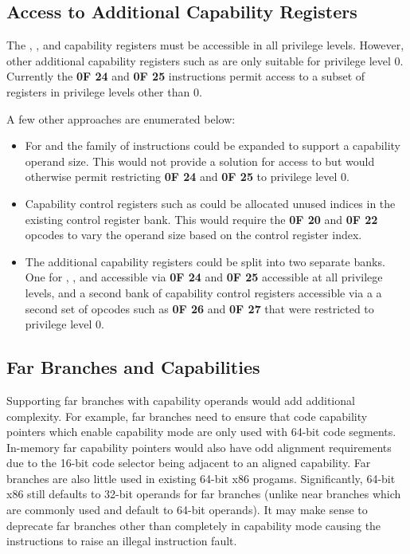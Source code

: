\subsection{Access to Additional Capability Registers}

The \CFS{}, \CGS{}, and \DDC{} capability registers must be accessible
in all privilege levels.  However, other additional capability
registers such as \KGS{} are only suitable for privilege level 0.
Currently the \textbf{0F 24} and \textbf{0F 25} instructions permit
access to a subset of registers in privilege levels other than 0.

A few other approaches are enumerated below:

\begin{itemize}
  \item For \CFS{} and \CGS{} the  family of
    instructions could be expanded to support a capability operand
    size.  This would not provide a solution for access to \DDC{} but
    would otherwise permit restricting \textbf{0F 24} and \textbf{0F
      25} to privilege level 0.

  \item Capability control registers such as \KGS{} could be allocated
    unused indices in the existing control register bank.  This would
    require the \textbf{0F 20} and \textbf{0F 22} opcodes to vary the
    operand size based on the control register index.

  \item The additional capability registers could be split into two
    separate banks.  One for \CFS{}, \CGS{}, and \DDC{} accessible via
    \textbf{0F 24} and \textbf{0F 25} accessible at all privilege
    levels, and a second bank of capability control registers
    accessible via a a second set of opcodes such as \textbf{0F 26}
    and \textbf{0F 27} that were restricted to privilege level 0.
\end{itemize}

\subsection{Far Branches and Capabilities}

Supporting far branches with capability operands would add additional
complexity.  For example, far branches need to ensure that code
capability pointers which enable capability mode are only used with
64-bit code segments.  In-memory far capability pointers would also
have odd alignment requirements due to the 16-bit code selector being
adjacent to an aligned capability.  Far branches are also little used
in existing 64-bit x86 progams.  Significantly, 64-bit x86 still
defaults to 32-bit operands for far branches (unlike near branches
which are commonly used and default to 64-bit operands).  It may make
sense to deprecate far branches other than  completely
in capability mode causing the instructions to raise an illegal
instruction fault.
